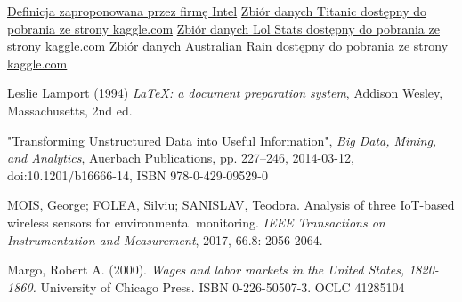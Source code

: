 \documentclass{book}
\begin{document}
\begin{thebibliography}{9}
    \href{https://www.intel.pl/content/www/pl/pl/analytics/resources/what-is-data-analytics.html}{Definicja zaproponowana przez firmę Intel}
    \href{https://www.kaggle.com/competitions/titanic/data?select=train.csv}{Zbiór danych Titanic dostępny do pobrania ze strony kaggle.com}
    \href{https://www.kaggle.com/datasets/vivovinco/league-of-legends-stats-s13}{Zbiór danych Lol Stats dostępny do pobrania ze strony kaggle.com}
    \href{https://www.kaggle.com/datasets/jsphyg/weather-dataset-rattle-package}{Zbiór danych Australian Rain dostępny do pobrania ze strony kaggle.com}
    
    Leslie Lamport (1994) \emph{\LaTeX: a document preparation system}, Addison
    Wesley, Massachusetts, 2nd ed.

    "Transforming Unstructured Data into Useful Information", \emph{Big Data, Mining, and Analytics}, Auerbach Publications, pp. 227–246, 2014-03-12, doi:10.1201/b16666-14, ISBN 978-0-429-09529-0

    MOIS, George; FOLEA, Silviu; SANISLAV, Teodora. Analysis of three IoT-based wireless sensors for environmental monitoring. \emph{IEEE Transactions on Instrumentation and Measurement}, 2017, 66.8: 2056-2064.
    
    Margo, Robert A. (2000). \emph{Wages and labor markets in the United States, 1820-1860.} University of Chicago Press. ISBN 0-226-50507-3. OCLC 41285104


    \end{thebibliography}
\end{document}
